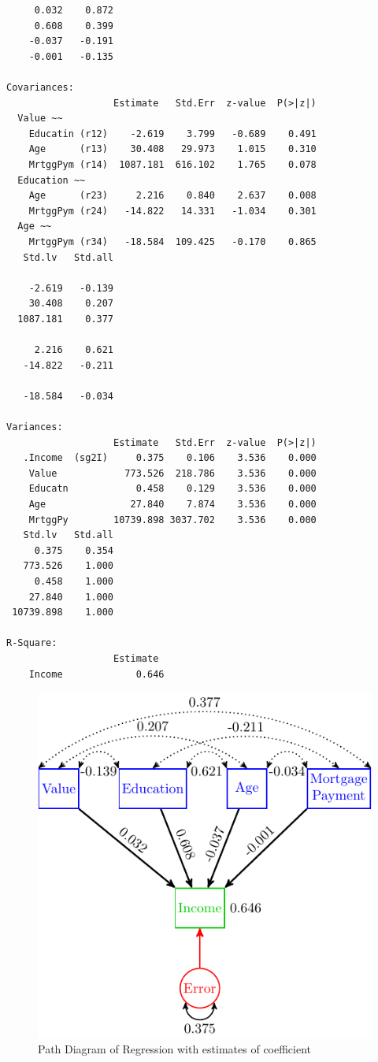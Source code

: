 \begin{verbatim}
     0.032    0.872
     0.608    0.399
    -0.037   -0.191
    -0.001   -0.135

Covariances:
                   Estimate   Std.Err  z-value  P(>|z|)
  Value ~~                                             
    Educatin (r12)    -2.619    3.799   -0.689    0.491
    Age      (r13)    30.408   29.973    1.015    0.310
    MrtggPym (r14)  1087.181  616.102    1.765    0.078
  Education ~~                                         
    Age      (r23)     2.216    0.840    2.637    0.008
    MrtggPym (r24)   -14.822   14.331   -1.034    0.301
  Age ~~                                               
    MrtggPym (r34)   -18.584  109.425   -0.170    0.865
   Std.lv   Std.all
                   
    -2.619   -0.139
    30.408    0.207
  1087.181    0.377
                   
     2.216    0.621
   -14.822   -0.211
                   
   -18.584   -0.034

Variances:
                   Estimate   Std.Err  z-value  P(>|z|)
   .Income  (sg2I)     0.375    0.106    3.536    0.000
    Value            773.526  218.786    3.536    0.000
    Educatn            0.458    0.129    3.536    0.000
    Age               27.840    7.874    3.536    0.000
    MrtggPy        10739.898 3037.702    3.536    0.000
   Std.lv   Std.all
     0.375    0.354
   773.526    1.000
     0.458    1.000
    27.840    1.000
 10739.898    1.000

R-Square:
                   Estimate 
    Income             0.646
\end{verbatim}

\begin{figure}[H]

{\centering \includegraphics[width=0.8\linewidth]{images/Reg2Values} 

}

\caption{Path Diagram of Regression with estimates of coefficient}\label{fig:Reg2Values}
\end{figure}

